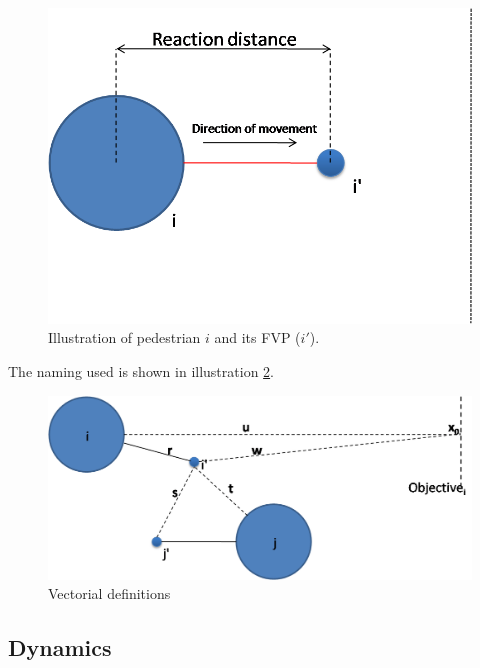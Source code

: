 \documentclass[draftclsnofoot]{IEEEtran}
\begin{document}
\begin{figure}[!ht]
    \centering{}
    \includegraphics[scale=0.4]{pics/pedestrian-top}
    \caption{\label{fig:pedestrian-geometry}Illustration of pedestrian $i$ and its FVP ($i'$).}
\end{figure}

The naming used is shown in illustration \ref{fig:pedestrian-vectors}.

\begin{figure}[!ht]
    \centering{}
    \includegraphics[scale=0.4]{pics/geometry}
    \caption{\label{fig:pedestrian-vectors}Vectorial definitions}
\end{figure}

\subsection{Dynamics}
\end{document}
